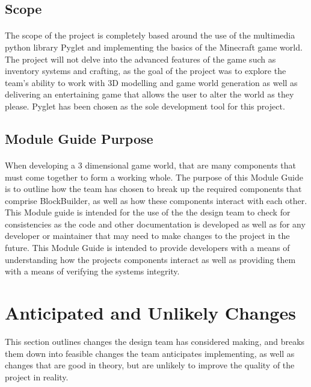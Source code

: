 \documentclass[12pt, titlepage]{article}
\begin{document}
\subsection{Scope}
\paragraph{}
The scope of the project is completely based around the use of the multimedia python library Pyglet and implementing the basics of the Minecraft game world. The project will not delve into the advanced features of the game such as inventory systems and crafting, as the goal of the project was to explore the team's ability to work with 3D modelling and game world generation as well as delivering an entertaining game that allows the user to alter the world as they please. Pyglet has been chosen as the sole development tool for this project. 

\subsection{Module Guide Purpose}
\paragraph{}
When developing a 3 dimensional game world, that are many components that must come together to form a working whole. The purpose of this Module Guide is to outline how the team has chosen to break up the required components that comprise BlockBuilder, as well as how these components interact with each other. This Module guide is intended for the use of the the design team to check for consistencies as the code and other documentation is developed as well as for any developer or maintainer that may need to make changes to the project in the future. This Module Guide is intended to provide developers with a means of understanding how the projects components interact as well as providing them with a means of verifying the systems integrity.
 

\section{Anticipated and Unlikely Changes} \label{SecChange}
This section outlines changes the design team has considered making, and breaks them down into feasible changes the team anticipates implementing, as well as changes that are good in theory, but are unlikely to improve the quality of the project in reality.
\end{document}
